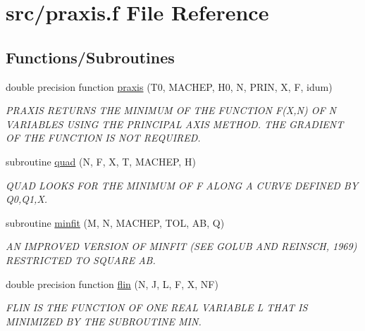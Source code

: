 \hypertarget{praxis_8f}{\section{src/praxis.f File Reference}
\label{praxis_8f}
}
\subsection*{Functions/\+Subroutines}
\begin{DoxyCompactItemize}
\item 
double precision function \hyperlink{praxis_8f_ad363b84325df8361d0bce4a2456bef23}{praxis} (T0, M\+A\+C\+H\+E\+P, H0, N, P\+R\+I\+N, X, F, idum)
\begin{DoxyCompactList}\small\item\em P\+R\+A\+X\+I\+S R\+E\+T\+U\+R\+N\+S T\+H\+E M\+I\+N\+I\+M\+U\+M O\+F T\+H\+E F\+U\+N\+C\+T\+I\+O\+N F(\+X,\+N) O\+F N V\+A\+R\+I\+A\+B\+L\+E\+S U\+S\+I\+N\+G T\+H\+E P\+R\+I\+N\+C\+I\+P\+A\+L A\+X\+I\+S M\+E\+T\+H\+O\+D. T\+H\+E G\+R\+A\+D\+I\+E\+N\+T O\+F T\+H\+E F\+U\+N\+C\+T\+I\+O\+N I\+S N\+O\+T R\+E\+Q\+U\+I\+R\+E\+D. \end{DoxyCompactList}\item 
subroutine \hyperlink{praxis_8f_a0527d011f50eb026ac3ceea522e0ca5a}{quad} (N, F, X, T, M\+A\+C\+H\+E\+P, H)
\begin{DoxyCompactList}\small\item\em Q\+U\+A\+D L\+O\+O\+K\+S F\+O\+R T\+H\+E M\+I\+N\+I\+M\+U\+M O\+F F A\+L\+O\+N\+G A C\+U\+R\+V\+E D\+E\+F\+I\+N\+E\+D B\+Y Q0,Q1,X. \end{DoxyCompactList}\item 
subroutine \hyperlink{praxis_8f_a4deca9e8eeda59dc7ea99e26c38d4a6d}{minfit} (M, N, M\+A\+C\+H\+E\+P, T\+O\+L, A\+B, Q)
\begin{DoxyCompactList}\small\item\em A\+N I\+M\+P\+R\+O\+V\+E\+D V\+E\+R\+S\+I\+O\+N O\+F M\+I\+N\+F\+I\+T (S\+E\+E G\+O\+L\+U\+B A\+N\+D R\+E\+I\+N\+S\+C\+H, 1969) R\+E\+S\+T\+R\+I\+C\+T\+E\+D T\+O S\+Q\+U\+A\+R\+E A\+B. \end{DoxyCompactList}\item 
double precision function \hyperlink{praxis_8f_a590128548b876bdd2e640b35ccee9515}{flin} (N, J, L, F, X, N\+F)
\begin{DoxyCompactList}\small\item\em F\+L\+I\+N I\+S T\+H\+E F\+U\+N\+C\+T\+I\+O\+N O\+F O\+N\+E R\+E\+A\+L V\+A\+R\+I\+A\+B\+L\+E L T\+H\+A\+T I\+S M\+I\+N\+I\+M\+I\+Z\+E\+D B\+Y T\+H\+E S\+U\+B\+R\+O\+U\+T\+I\+N\+E M\+I\+N. \end{DoxyCompactList}\item 

\end{DoxyCompactItemize}
